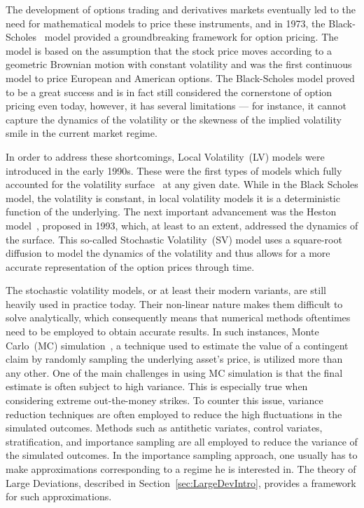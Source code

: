 The development of options trading and derivatives markets eventually led to the need for mathematical models to price these instruments, and in 1973, the Black-Scholes~\cite{Black1973TheLiabilities} model provided a groundbreaking framework for option pricing.
The model is based on the assumption that the stock price moves according to a geometric Brownian motion with constant volatility and was the first continuous model to price European and American options. The Black-Scholes model proved to be a great success and is in fact still considered the cornerstone of option pricing even today, however, it has several limitations --- for instance, it cannot capture the dynamics of the volatility or the skewness of the implied volatility smile in the current market regime.

In order to address these shortcomings, Local Volatility~(LV) models were introduced in the early 1990s. These were the first types of models which fully accounted for the volatility surface~\cite{Dupire1994PricingSmile, Derman1994RidingSmile} at any given date. While in the Black Scholes model, the volatility is constant, in local volatility models it is a deterministic function of the underlying. The next important advancement was the Heston model~\cite{Heston1993AOptions}, proposed in 1993, which, at least to an extent, addressed the dynamics of the surface. This so-called Stochastic Volatility~(SV) model uses a square-root diffusion to model the dynamics of the volatility and thus allows for a more accurate representation of the option prices through time.

The stochastic volatility models, or at least their modern variants, are still heavily used in practice today. Their non-linear nature makes them difficult to solve analytically, which consequently means that numerical methods oftentimes need to be employed to obtain accurate results. In such instances, Monte Carlo~(MC) simulation~\cite{Glasserman2013MonteEngineering}, a technique used to estimate the value of a contingent claim by randomly sampling the underlying asset's price, is utilized more than any other. One of the main challenges in using MC simulation is that the final estimate is often subject to high variance. This is especially true when considering extreme out-the-money strikes. To counter this issue, variance reduction techniques are often employed to reduce the high fluctuations in the simulated outcomes. Methods such as antithetic variates, control variates, stratification, and importance sampling are all employed to reduce the variance of the simulated outcomes. In the importance sampling approach, one usually has to make approximations corresponding to a regime he is interested in. The theory of Large Deviations, described in Section~\ref{sec:LargeDevIntro}, provides a framework for such approximations.

